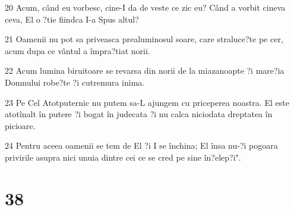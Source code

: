 \par 20 Acum, când eu vorbesc, cine-I da de veste ce zic eu? Când a vorbit cineva ceva, El o ?tie fiindca I-a Spus altul?
\par 21 Oamenii nu pot sa priveasca prealuminosul soare, care straluce?te pe cer, acum dupa ce vântul a împra?tiat norii.
\par 22 Acum lumina biruitoare se revarsa din norii de la miazanoapte ?i mare?ia Domnului robe?te ?i cutremura inima.
\par 23 Pe Cel Atotputernic nu putem sa-L ajungem cu priceperea noastra. El este atotînalt în putere ?i bogat în judecata ?i nu calca niciodata dreptatea în picioare.
\par 24 Pentru aceea oamenii se tem de El ?i I se închina; El însa nu-?i pogoara privirile asupra nici unuia dintre cei ce se cred pe sine în?elep?i".

\chapter{38}

